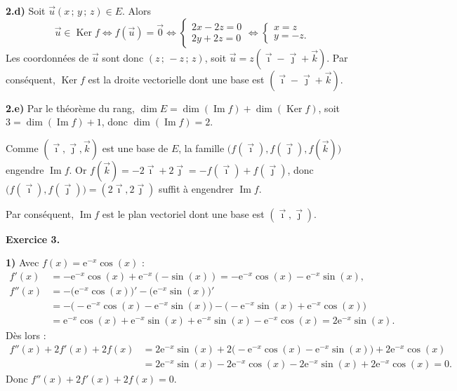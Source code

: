 \smallskip
\noindent\textbf{2.d)} Soit $\vec u(x\,;\,y\,;\,z)\in E$. Alors
\[ \vec u\in\operatorname{Ker}f\iff f(\vec u)=\vec0\iff\begin{cases}2x-2z=0\\2y+2z=0\end{cases}\iff\begin{cases}x=z\\y=-z.\end{cases} \]
Les coordonnées de $\vec u$ sont donc $(z\,;\,-z\,;\,z)$, soit $\vec u=z(\vec\imath-\vec\jmath+\vec k)$.
Par conséquent, $\operatorname{Ker}f$ est la droite vectorielle dont une base est $(\vec\imath-\vec\jmath+\vec k)$.

\smallskip
\noindent\textbf{2.e)} Par le théorème du rang, $\dim E=\dim(\operatorname{Im}f)+\dim(\operatorname{Ker}f)$,
soit $3=\dim(\operatorname{Im}f)+1$, donc $\dim(\operatorname{Im}f)=2$.

Comme $(\vec\imath,\vec\jmath,\vec k)$ est une base de $E$, la famille $\big(f(\vec\imath),f(\vec\jmath),f(\vec k)\big)$ engendre
$\operatorname{Im}f$. Or $f(\vec k)=-2\vec\imath+2\vec\jmath=-f(\vec\imath)+f(\vec\jmath)$, donc $\big(f(\vec\imath),f(\vec\jmath)\big)=(2\vec\imath,2\vec\jmath)$
suffit à engendrer $\operatorname{Im}f$.

Par conséquent, $\operatorname{Im}f$ est le plan vectoriel dont une base est $(\vec\imath,\vec\jmath)$.

\bigskip
\noindent\textbf{Exercice 3.}

\smallskip
\noindent\textbf{1)} Avec $f(x)=\mathrm{e}^{-x}\cos(x)$ :
\begin{align*}
f'(x)&=-\mathrm{e}^{-x}\cos(x)+\mathrm{e}^{-x}(-\sin(x))=-\mathrm{e}^{-x}\cos(x)-\mathrm{e}^{-x}\sin(x),\\
f''(x)&=-\big(\mathrm{e}^{-x}\cos(x)\big)'-\big(\mathrm{e}^{-x}\sin(x)\big)'\\
&=-\big(-\mathrm{e}^{-x}\cos(x)-\mathrm{e}^{-x}\sin(x)\big)-\big(-\mathrm{e}^{-x}\sin(x)+\mathrm{e}^{-x}\cos(x)\big)\\
&=\mathrm{e}^{-x}\cos(x)+\mathrm{e}^{-x}\sin(x)+\mathrm{e}^{-x}\sin(x)-\mathrm{e}^{-x}\cos(x)=2\mathrm{e}^{-x}\sin(x).
\end{align*}
Dès lors :
\begin{align*}
f''(x)+2f'(x)+2f(x)&=2\mathrm{e}^{-x}\sin(x)+2\big(-\mathrm{e}^{-x}\cos(x)-\mathrm{e}^{-x}\sin(x)\big)+2\mathrm{e}^{-x}\cos(x)\\
&=2\mathrm{e}^{-x}\sin(x)-2\mathrm{e}^{-x}\cos(x)-2\mathrm{e}^{-x}\sin(x)+2\mathrm{e}^{-x}\cos(x)=0.
\end{align*}
Donc $f''(x)+2f'(x)+2f(x)=0$.

